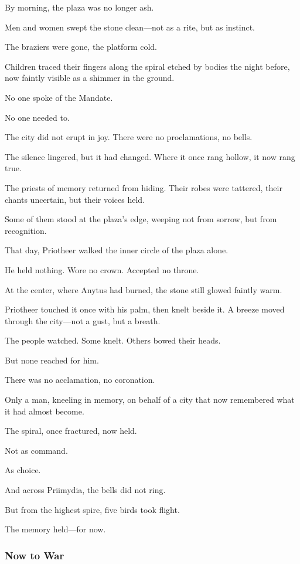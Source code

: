 \documentclass[12pt]{article}
\begin{document}
By morning, the plaza was no longer ash.

Men and women swept the stone clean—not as a rite, but as instinct. 

The braziers were gone, the platform cold. 

Children traced their fingers along the spiral etched by bodies the night before, now faintly visible as a shimmer in the ground. 

No one spoke of the Mandate. 

No one needed to.

The city did not erupt in joy. There were no proclamations, no bells. 

The silence lingered, but it had changed. Where it once rang hollow, it now rang true.

The priests of memory returned from hiding. Their robes were tattered, their chants uncertain, but their voices held. 

Some of them stood at the plaza’s edge, weeping not from sorrow, but from recognition.

That day, Priotheer walked the inner circle of the plaza alone.

He held nothing. Wore no crown. Accepted no throne.

At the center, where Anytus had burned, the stone still glowed faintly warm. 

Priotheer touched it once with his palm, then knelt beside it. A breeze moved through the city—not a gust, but a breath.

The people watched. Some knelt. Others bowed their heads.

But none reached for him.

There was no acclamation, no coronation. 

Only a man, kneeling in memory, on behalf of a city that now remembered what it had almost become.

The spiral, once fractured, now held.

Not as command.

As choice.

And across Priimydia, the bells did not ring.

But from the highest spire, five birds took flight.

The memory held—for now.

\dotfill

\subsubsection*{Now to War}
\end{document}

